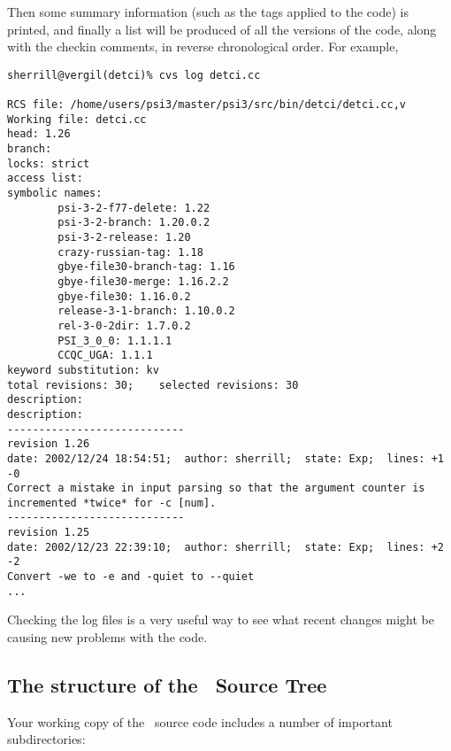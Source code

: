 Then some summary information (such as the tags applied to the code)
is printed, and finally a list will be produced of all the versions of
the code, along with the checkin comments, in reverse chronological
order.  For example,
\begin{verbatim}
sherrill@vergil(detci)% cvs log detci.cc

RCS file: /home/users/psi3/master/psi3/src/bin/detci/detci.cc,v
Working file: detci.cc
head: 1.26
branch:
locks: strict
access list:
symbolic names:
        psi-3-2-f77-delete: 1.22
        psi-3-2-branch: 1.20.0.2
        psi-3-2-release: 1.20
        crazy-russian-tag: 1.18
        gbye-file30-branch-tag: 1.16
        gbye-file30-merge: 1.16.2.2
        gbye-file30: 1.16.0.2
        release-3-1-branch: 1.10.0.2
        rel-3-0-2dir: 1.7.0.2
        PSI_3_0_0: 1.1.1.1
        CCQC_UGA: 1.1.1
keyword substitution: kv
total revisions: 30;    selected revisions: 30
description:
description:
----------------------------
revision 1.26
date: 2002/12/24 18:54:51;  author: sherrill;  state: Exp;  lines: +1 -0
Correct a mistake in input parsing so that the argument counter is
incremented *twice* for -c [num].
----------------------------
revision 1.25
date: 2002/12/23 22:39:10;  author: sherrill;  state: Exp;  lines: +2 -2
Convert -we to -e and -quiet to --quiet
...
\end{verbatim}

Checking the log files is a very useful way to see what recent changes might 
be causing new problems with the code.

\subsection{The structure of the \PSIthree\ Source Tree}
\label{psitree} 

Your working copy of the \PSIthree\ source code includes a number of
important subdirectories:

